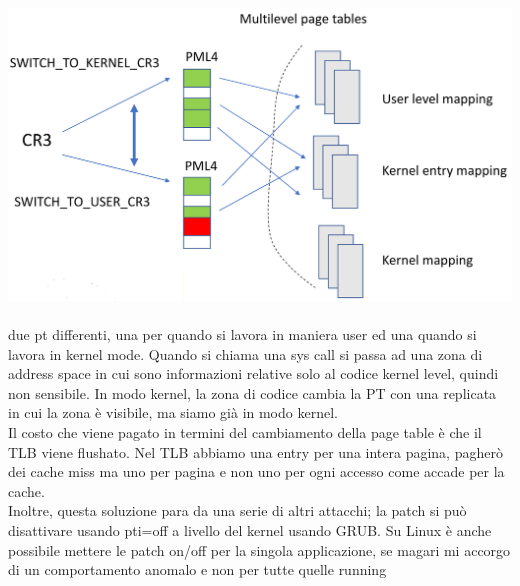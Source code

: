 \documentclass[12pt, oneside]{extbook}
\begin{document}
\includegraphics[scale=0.3]{immagini/KAISER}\\\\
due pt differenti, una per quando si lavora in maniera user ed una quando si lavora in kernel mode. Quando si chiama una sys call si passa ad una zona di address space in cui sono informazioni relative solo al codice kernel level, quindi non sensibile. In modo kernel, la zona di codice cambia la PT con una replicata in cui la zona è visibile, ma siamo già in modo kernel.\\ Il costo che viene pagato in termini del cambiamento della page table è che il TLB viene flushato. Nel TLB abbiamo una entry per una intera pagina, pagherò dei cache miss ma uno per pagina e non uno per ogni accesso come accade per la cache.\\ Inoltre, questa soluzione para da una serie di altri attacchi; la patch si può disattivare usando \textsf{pti=off} a livello del kernel usando GRUB. Su Linux è anche possibile mettere le patch on/off per la singola applicazione, se magari mi accorgo di un comportamento anomalo e non per tutte quelle running
\end{document}
